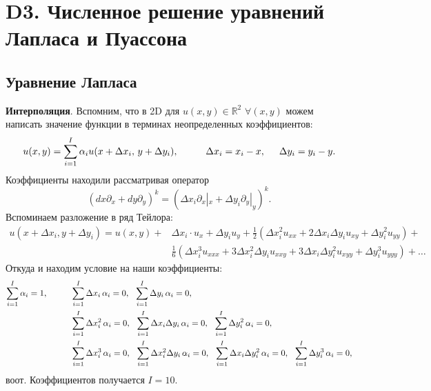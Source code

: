 \section{D3. Численное решение уравнений Лапласа и Пуассона}

\subsection*{Уравнение Лапласа}


\textbf{Интерполяция}. Вспомним, что в 2D
 для $u(x, y) \in \mathbb{R}^2$ 
$\forall (x, y)$
можем написать значение функции в терминах неопределенных коэффициентов:
\begin{equation*}
	u(x, y) = \sum_{i=1}^{I} \alpha_i u(x + \Delta x_i,\, y + \Delta y_i),
	\hspace{10 mm} 
	\Delta x_i = x_i-x,
	\hspace{5 mm} 
	\Delta y_i = y_i-y.
\end{equation*}
Коэффициенты находили рассматривая оператор
\begin{equation*}
	\left(dx \partial_x + dy \partial_y\right)^k = \left(\Delta x_i \partial_x |_x + \Delta y_i \partial_y |_y\right)^k.
\end{equation*}
Вспоминаем разложение в ряд Тейлора:
\begin{align*}
	u(x + \Delta x_i, y + \Delta y_i) = u(x, y) + &\Delta x_i \cdot u_x  + \Delta y_i u_y + \frac{1}{2}\left(
		\Delta x_i^2 u_{xx} + 2 \Delta x_i \Delta y_i u_{xy} + \Delta y_i^2 u_{yy}
	\right) + \\ &\frac{1}{6} \left(
		\Delta x_i^3 u_{xxx} + 3 \Delta x_i^2 \Delta y_i u_{xxy} + 3 \Delta x_i \Delta y_i^2 u_{xyy} + \Delta y_i^3 u_{yyy}
	\right) + \ldots
\end{align*}
Откуда и находим условие на наши коэффициенты:
\begin{align*}
	\sum_{i=1}^{I} \alpha_i = 1,
	\hspace{10 mm} 
	&\sum_{i=1}^{I} \Delta x_i \, \alpha_i = 0, 
	\hspace{2.5 mm} 
	\sum_{i=1}^{I} \Delta y_i \, \alpha_i = 0, \\
	&\sum_{i=1}^{I} \Delta x_i^2 \, \alpha_i = 0,
	\hspace{2.5 mm} 
	\sum_{i=1}^{I} \Delta x_i \Delta y_i \, \alpha_i = 0,
	\hspace{2.5 mm} 
	\sum_{i=1}^{I} \Delta y_i^2 \, \alpha_i = 0, \\
	&\sum_{i=1}^{I} \Delta x_i^3 \, \alpha_i = 0,
	\hspace{2.5 mm} 
	\sum_{i=1}^{I} \Delta x_i^2 \Delta y_i \, \alpha_i = 0,
	\hspace{2.5 mm} 
	\sum_{i=1}^{I} \Delta x_i \Delta y_i^2 \, \alpha_i = 0,
	\hspace{2.5 mm} 
	\sum_{i=1}^{I} \Delta y_i^3 \, \alpha_i = 0,
\end{align*}
воот. Коэффициентов получается $I = 10$. 


